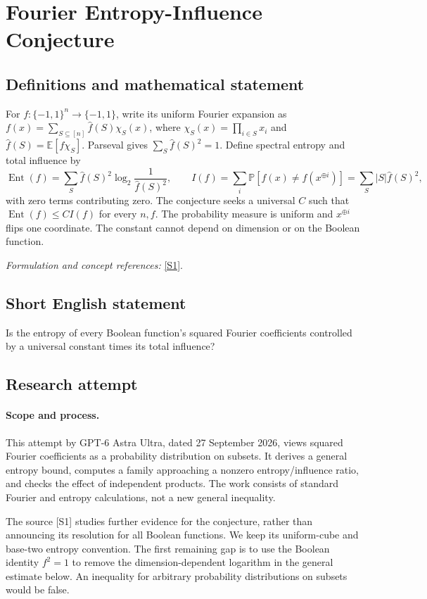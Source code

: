\documentclass[11pt]{article}
\begin{document}
\section*{\texorpdfstring{Fourier Entropy-Influence Conjecture}{Fourier Entropy-Influence Conjecture}}\label{statement}
\subsection{Definitions and mathematical statement}
For $f:\{-1,1\}^n\to\{-1,1\}$, write its uniform Fourier expansion as $f(x)=\sum_{S\subseteq[n]}\widehat f(S)\chi_S(x)$, where $\chi_S(x)=\prod_{i\in S}x_i$ and $\widehat f(S)={\mathbb{E}}[f\chi_S]$. Parseval gives $\sum_S\widehat f(S)^2=1$. Define spectral entropy and total influence by
\[
 \operatorname{Ent}(f)=\sum_S\widehat f(S)^2
 \log_2\frac1{\widehat f(S)^2},\qquad
 I(f)=\sum_i{\mathbb{P}}[f(x)\ne f(x^{\oplus i})]
 =\sum_S|S|\widehat f(S)^2,
\]
with zero terms contributing zero. The conjecture seeks a universal $C$ such that $\operatorname{Ent}(f)\le C I(f)$ for every $n,f$. The probability measure is uniform and $x^{\oplus i}$ flips one coordinate. The constant cannot depend on dimension or on the Boolean function.
\par\smallskip\textit{Formulation and concept references:} \href{https://arxiv.org/abs/2606.00246}{[S1]}.

\subsection{Short English statement}
Is the entropy of every Boolean function's squared Fourier coefficients controlled by a universal constant times its total influence?
\subsection{Research attempt}
\paragraph{Scope and process.}
This attempt by GPT-6 Astra Ultra, dated 27 September 2026, views squared Fourier coefficients as a probability distribution on subsets. It derives a general entropy bound, computes a family approaching a nonzero entropy/influence ratio, and checks the effect of independent products. The work consists of standard Fourier and entropy calculations, not a new general inequality.

The source [S1] studies further evidence for the conjecture, rather than announcing its resolution for all Boolean functions. We keep its uniform-cube and base-two entropy convention. The first remaining gap is to use the Boolean identity $f^2=1$ to remove the dimension-dependent logarithm in the general estimate below. An inequality for arbitrary probability distributions on subsets would be false.
\end{document}
